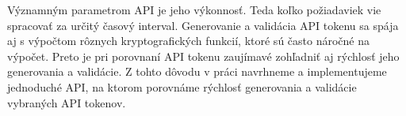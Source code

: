Významným parametrom API je jeho výkonnosť. Teda koľko požiadaviek vie spracovať za určitý časový interval. Generovanie a validácia API tokenu sa spája aj s výpočtom rôznych kryptografických funkcií, ktoré sú často náročné na výpočet. Preto je pri porovnaní API tokenu zaujímavé zohľadniť aj rýchlosť jeho generovania a validácie. Z tohto dôvodu v práci navrhneme a implementujeme jednoduché API, na ktorom porovnáme rýchlosť generovania a validácie vybraných API tokenov.

